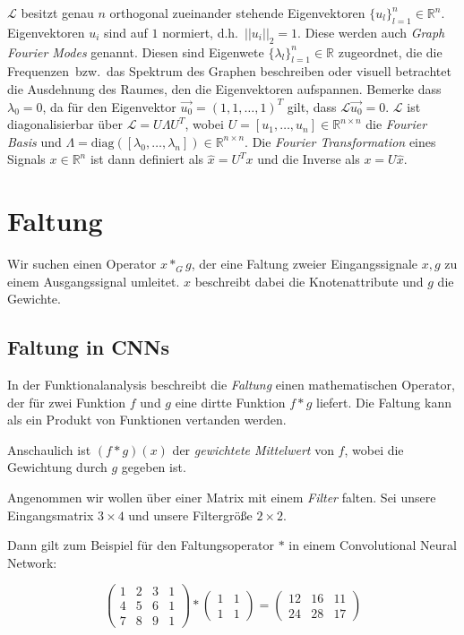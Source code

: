 $\mathcal{L}$ besitzt genau $n$ orthogonal zueinander stehende Eigenvektoren $\lbrace u_l \rbrace_{l=1}^n \in \mathbb{R}^n$.
Eigenvektoren $u_i$ sind auf $1$ normiert, d.h.\ $||u_i||_2 = 1$.
Diese werden auch \emph{Graph Fourier Modes} genannt.
Diesen sind Eigenwete $\lbrace \lambda_l \rbrace_{l=1}^n \in \mathbb{R}$ zugeordnet, die die \glqq{}Frequenzen\grqq\ bzw.\ das Spektrum des Graphen beschreiben oder visuell betrachtet die Ausdehnung des Raumes, den die Eigenvektoren aufspannen.
Bemerke dass $\lambda_0 = 0$, da für den Eigenvektor $\vec{u_0} = {(1, 1, \ldots, 1)}^T$ gilt, dass $\mathcal{L}\vec{u_0} = 0$.
$\mathcal{L}$ ist diagonalisierbar über $\mathcal{L} = U \Lambda U^T$, wobei $U = [u_1, \ldots, u_n] \in \mathbb{R}^{n \times n}$ die \emph{Fourier Basis} und $\Lambda = \text{diag}([\lambda_0, \ldots, \lambda_n]) \in \mathbb{R}^{n \times n}$.
Die \emph{Fourier Transformation} eines Signals $x \in \mathbb{R}^n$ ist dann definiert als $\hat{x} = U^{T}x$ und die Inverse als $x = U\hat{x}$.

\section{Faltung}

Wir suchen einen Operator $x *_G g$, der eine Faltung zweier Eingangssignale $x, g$ zu einem Ausgangssignal umleitet.
$x$ beschreibt dabei die Knotenattribute und $g$ die Gewichte.

\subsection{Faltung in CNNs}

In der Funktionalanalysis beschreibt die \emph{Faltung} einen mathematischen Operator, der für zwei Funktion $f$ und $g$ eine dirtte Funktion $f * g$ liefert.
Die Faltung kann als ein Produkt von Funktionen vertanden werden.

Anschaulich ist $(f * g)(x)$ der \emph{gewichtete Mittelwert} von $f$, wobei die Gewichtung durch $g$ gegeben ist.

Angenommen wir wollen über einer Matrix mit einem \emph{Filter} falten.
Sei unsere Eingangsmatrix $3 \times 4$ und unsere Filtergröße $2 \times 2$.

Dann gilt zum Beispiel für den Faltungsoperator $*$ in einem Convolutional Neural Network:

\begin{equation}
  \begin{pmatrix}
    1 & 2 & 3 & 1\\
    4 & 5 & 6 & 1\\
    7 & 8 & 9 & 1
  \end{pmatrix} * \begin{pmatrix}
    1 & 1\\
    1 & 1
  \end{pmatrix} = \begin{pmatrix}
    12 & 16 & 11\\
    24 & 28 & 17
  \end{pmatrix}
\end{equation}

